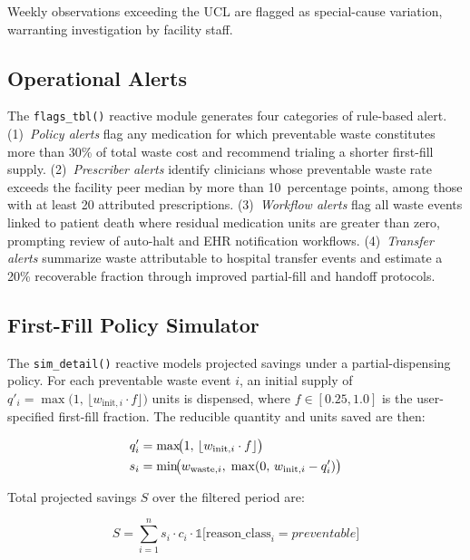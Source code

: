 \documentclass[letterpaper, 10pt, conference]{IEEEconf}
\begin{document}
Weekly observations exceeding the UCL are flagged as special-cause variation,
warranting investigation by facility staff.

\subsection{Operational Alerts}

The \texttt{flags\_tbl()} reactive module generates four categories of
rule-based alert.
(1)~\textit{Policy alerts} flag any medication for which preventable waste
constitutes more than 30\% of total waste cost and recommend trialing a
shorter first-fill supply.
(2)~\textit{Prescriber alerts} identify clinicians whose preventable waste
rate exceeds the facility peer median by more than 10~percentage points,
among those with at least 20 attributed prescriptions.
(3)~\textit{Workflow alerts} flag all waste events linked to patient death
where residual medication units are greater than zero, prompting review of
auto-halt and EHR notification workflows.
(4)~\textit{Transfer alerts} summarize waste attributable to hospital transfer
events and estimate a 20\% recoverable fraction through improved partial-fill
and handoff protocols.

\subsection{First-Fill Policy Simulator}

The \texttt{sim\_detail()} reactive models projected savings under a
partial-dispensing policy.
For each preventable waste event $i$, an initial supply of
$q'_i = \max\!\bigl(1,\,\lfloor w_{\text{init},i} \cdot f \rfloor\bigr)$
units is dispensed, where $f \in [0.25, 1.0]$ is the user-specified
first-fill fraction.
The reducible quantity and units saved are then:

\begin{align}
  q'_i &= \max\!\bigl(1,\,\lfloor w_{\text{init},i} \cdot f \rfloor\bigr)
  \label{eq:simulator} \\
  s_i  &= \min\!\bigl(w_{\text{waste},i},\;
           \max(0,\, w_{\text{init},i} - q'_i)\bigr) \notag
\end{align}

Total projected savings $S$ over the filtered period are:

\begin{equation}
  S = \sum_{i=1}^{n} s_i \cdot c_i \cdot
      \mathbb{1}\bigl[\text{reason\_class}_i = \textit{preventable}\bigr]
\label{eq:savings}
\end{equation}
\end{document}
